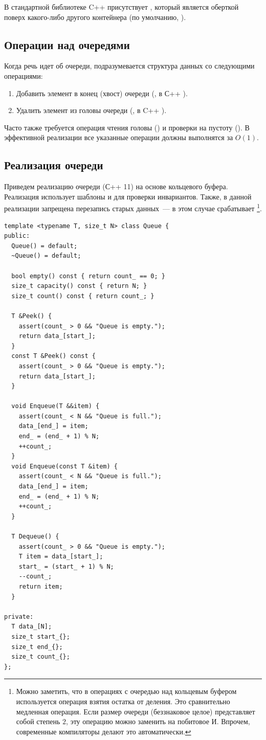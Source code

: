 В стандартной библиотеке C++ присутствует  , который является оберткой поверх
какого-либо другого контейнера (по умолчанию, ).

\subsection{Операции над очередями}
Когда речь идет об очереди, подразумевается структура данных со следующими операциями:
\begin{enumerate}
  \item Добавить элемент в конец (хвост) очереди (, в С++ ).
  \item Удалить элемент из головы очереди (, в C++ ).
\end{enumerate}
%
Часто также требуется операция чтения головы () и проверки на пустоту (). В эффективной реализации
все указанные операции должны выполнятся за \(O(1)\).

\subsection{Реализация очереди}
Приведем реализацию очереди (С++ 11) на основе кольцевого буфера. Реализация использует шаблоны и 
для проверки инвариантов. Также, в данной реализации запрещена перезапись старых данных~--- в этом случае срабатывает  \footnote{Можно заметить, что в операциях с очередью над кольцевым буфером используется операция взятия остатка от деления. Это сравнительно
  медленная операция. Если размер очереди (беззнаковое целое) представляет собой степень \(2\), эту операцию можно заменить на побитовое И. Впрочем, современные
  компиляторы делают это автоматически.}.

\begin{verbatim}
template <typename T, size_t N> class Queue {
public:
  Queue() = default;
  ~Queue() = default;

  bool empty() const { return count_ == 0; }
  size_t capacity() const { return N; }
  size_t count() const { return count_; }

  T &Peek() {
    assert(count_ > 0 && "Queue is empty.");
    return data_[start_];
  }
  const T &Peek() const {
    assert(count_ > 0 && "Queue is empty.");
    return data_[start_];
  }

  void Enqueue(T &&item) {
    assert(count_ < N && "Queue is full.");
    data_[end_] = item;
    end_ = (end_ + 1) % N;
    ++count_;
  }
  void Enqueue(const T &item) {
    assert(count_ < N && "Queue is full.");
    data_[end_] = item;
    end_ = (end_ + 1) % N;
    ++count_;
  }

  T Dequeue() {
    assert(count_ > 0 && "Queue is empty.");
    T item = data_[start_];
    start_ = (start_ + 1) % N;
    --count_;
    return item;
  }

private:
  T data_[N];
  size_t start_{};
  size_t end_{};
  size_t count_{};
};
\end{verbatim}
